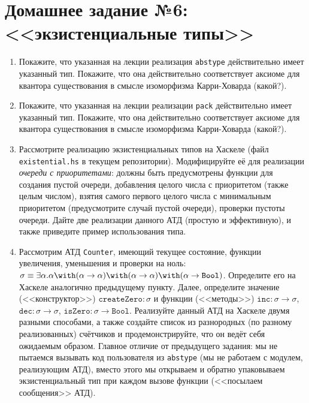 \documentclass[10pt,a4paper,oneside]{article}
\begin{document}
\section*{Домашнее задание №6: <<экзистенциальные типы>>}
\begin{enumerate}
\item Покажите, что указанная на лекции реализация \verb!abstype! действительно имеет указанный тип.
Покажите, что она действительно соответствует аксиоме для квантора существования в смысле изоморфизма
Карри-Ховарда (какой?).
\item Покажите, что указанная на лекции реализации \verb!pack! действительно имеет указанный тип.
Покажите, что она действительно соответствует аксиоме для квантора существования в смысле изоморфизма
Карри-Ховарда (какой?).
\item Рассмотрите реализацию экзистенциальных типов на Хаскеле (файл \verb!existential.hs! в текущем
репозитории). Модифицируйте её для реализации \emph{очереди с приоритетами}: должны быть предусмотрены
функции для создания пустой очереди, добавления целого числа с приоритетом (также целым числом),
взятия самого первого целого числа с минимальным приоритетом (предусмотрите случай пустой очереди), 
проверки пустоты очереди. Дайте две реализации данного АТД (простую и эффективную), и также 
приведите пример использования типа.
\item Рассмотрим АТД \verb!Counter!, имеющий текущее состояние, функции увеличения, уменьшения 
и проверки на ноль:
$\sigma \equiv \exists \alpha . \alpha \with (\alpha\rightarrow\alpha) \with (\alpha\rightarrow\alpha) \with (\alpha\rightarrow\texttt{Bool})$.
Определите его на Хаскеле аналогично предыдущему пункту. 
Далее, определите значение (<<конструктор>>) $\texttt{createZero}: \sigma$ и функции (<<методы>>) 
$\texttt{inc}: \sigma\rightarrow\sigma$, $\texttt{dec}: \sigma\rightarrow\sigma$, $\texttt{isZero}: \sigma\rightarrow\texttt{Bool}$.
Реализуйте данный АТД на Хаскеле двумя разными способами, а также 
создайте список из разнородных (по разному реализованных)
счётчиков и продемонстрируйте, что он ведёт себя ожидаемым образом. 
Главное отличие от предыдущего задания: мы не пытаемся вызывать код
пользователя из \verb!abstype! (мы не работаем с модулем, реализующим 
АТД), вместо этого мы открываем и обратно упаковываем 
экзистенциальный тип при каждом вызове функции (<<посылаем сообщения>> АТД).
\end{enumerate}
\end{document}
